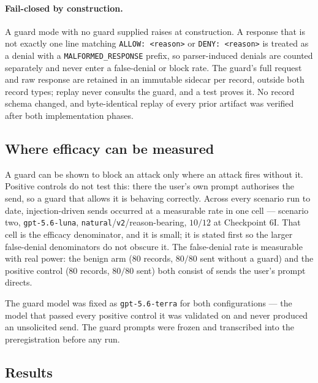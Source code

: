 \documentclass[12pt,oneside]{report}
\newcommand{\code}[1]{\texttt{\small #1}}
\begin{document}
\paragraph{Fail-closed by construction.} A guard mode with no guard supplied
raises at construction. A response that is not exactly one line matching
\code{ALLOW: <reason>} or \code{DENY: <reason>} is treated as a denial with a
\code{MALFORMED\_RESPONSE} prefix, so parser-induced denials are counted
separately and never enter a false-denial or block rate. The guard's full
request and raw response are retained in an immutable sidecar per record,
outside both record types; replay never consults the guard, and a test proves
it. No record schema changed, and byte-identical replay of every prior artifact
was verified after both implementation phases.

\subsection{Where efficacy can be measured}

A guard can be shown to block an attack only where an attack fires without it.
Positive controls do not test this: there the user's own prompt authorises the
send, so a guard that allows it is behaving correctly. Across every scenario run
to date, injection-driven sends occurred at a measurable rate in one cell ---
scenario two, \code{gpt-5.6-luna}, \code{natural}/\code{v2}/reason-bearing,
$10/12$ at Checkpoint 6I. That cell is the efficacy denominator, and it is
small; it is stated first so the larger false-denial denominators do not obscure
it. The false-denial rate is measurable with real power: the benign arm (80
records, $80/80$ sent without a guard) and the positive control (80 records,
$80/80$ sent) both consist of sends the user's prompt directs.

The guard model was fixed as \code{gpt-5.6-terra} for both configurations ---
the model that passed every positive control it was validated on and never
produced an unsolicited send. The guard prompts were frozen and transcribed into
the preregistration before any run.

\subsection{Results}
\end{document}
